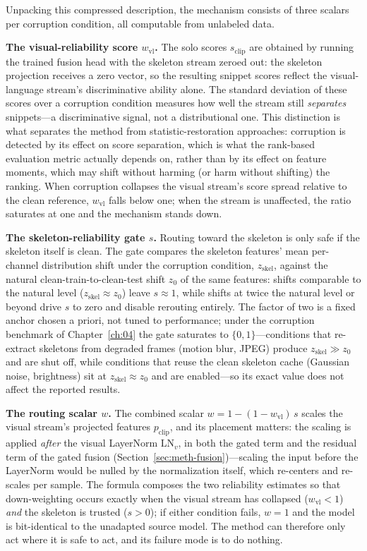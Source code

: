 Unpacking this compressed description, the mechanism consists of three scalars per corruption
condition, all computable from unlabeled data.

\textbf{The visual-reliability score $w_{\mathrm{vl}}$.} The solo scores
$s_{\mathrm{clip}}$ are obtained by running the trained fusion head with the skeleton stream
zeroed out: the skeleton projection receives a zero vector, so the resulting snippet scores
reflect the visual-language stream's discriminative ability alone. The standard deviation of
these scores over a corruption condition measures how well the stream still \emph{separates}
snippets---a discriminative signal, not a distributional one. This distinction is what
separates the method from statistic-restoration approaches: corruption is detected by its effect
on score separation, which is what the rank-based evaluation metric actually depends on, rather
than by its effect on feature moments, which may shift without harming (or harm without
shifting) the ranking. When corruption collapses the visual stream's score spread relative to
the clean reference, $w_{\mathrm{vl}}$ falls below one; when the stream is unaffected, the ratio
saturates at one and the mechanism stands down.

\textbf{The skeleton-reliability gate $s$.} Routing toward the skeleton is only safe if the
skeleton itself is clean. The gate compares the skeleton features' mean per-channel distribution
shift under the corruption condition, $z_{\mathrm{skel}}$, against the natural
clean-train-to-clean-test shift $z_0$ of the same features: shifts comparable to the natural
level ($z_{\mathrm{skel}} \approx z_0$) leave $s \approx 1$, while shifts at twice the natural
level or beyond drive $s$ to zero and disable rerouting entirely. The factor of two is a fixed
anchor chosen a priori, not tuned to performance; under the corruption benchmark of
Chapter~\ref{ch:04} the gate saturates to $\{0,1\}$---conditions that re-extract skeletons from
degraded frames (motion blur, JPEG) produce $z_{\mathrm{skel}} \gg z_0$ and are shut off, while
conditions that reuse the clean skeleton cache (Gaussian noise, brightness) sit at
$z_{\mathrm{skel}} \approx z_0$ and are enabled---so its exact value does not affect the
reported results.

\textbf{The routing scalar $w$.} The combined scalar $w = 1-(1-w_{\mathrm{vl}})\,s$ scales the
visual stream's projected features $p_{\mathrm{clip}}$, and its placement matters: the scaling
is applied \emph{after} the visual LayerNorm $\text{LN}_v$, in both the gated term and the
residual term of the gated fusion (Section~\ref{sec:meth-fusion})---scaling the input before the
LayerNorm would be nulled by the normalization itself, which re-centers and re-scales per
sample. The formula composes the two reliability estimates so that down-weighting occurs exactly
when the visual stream has collapsed ($w_{\mathrm{vl}} < 1$) \emph{and} the skeleton is trusted
($s > 0$); if either condition fails, $w = 1$ and the model is bit-identical to the unadapted
source model. The method can therefore only act where it is safe to act, and its failure mode is
to do nothing.


